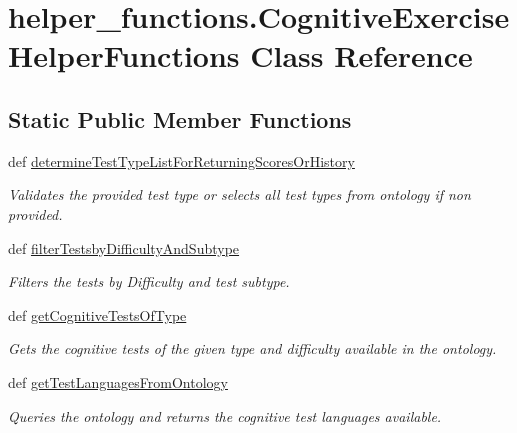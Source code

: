 \hypertarget{classhelper__functions_1_1CognitiveExerciseHelperFunctions}{\section{helper\-\_\-functions.\-Cognitive\-Exercise\-Helper\-Functions Class Reference}
\label{classhelper__functions_1_1CognitiveExerciseHelperFunctions}
}
\subsection*{Static Public Member Functions}
\begin{DoxyCompactItemize}
\item 
def \hyperlink{classhelper__functions_1_1CognitiveExerciseHelperFunctions_a3c7b93ecb18a8f644acd41b39c7cda38}{determine\-Test\-Type\-List\-For\-Returning\-Scores\-Or\-History}
\begin{DoxyCompactList}\small\item\em Validates the provided test type or selects all test types from ontology if non provided. \end{DoxyCompactList}\item 
def \hyperlink{classhelper__functions_1_1CognitiveExerciseHelperFunctions_a5f06797d72eabbb7f2fe16cd78a53a2f}{filter\-Testsby\-Difficulty\-And\-Subtype}
\begin{DoxyCompactList}\small\item\em Filters the tests by Difficulty and test subtype. \end{DoxyCompactList}\item 
def \hyperlink{classhelper__functions_1_1CognitiveExerciseHelperFunctions_ab6068ecebe273ff39840754b613d2474}{get\-Cognitive\-Tests\-Of\-Type}
\begin{DoxyCompactList}\small\item\em Gets the cognitive tests of the given type and difficulty available in the ontology. \end{DoxyCompactList}\item 
def \hyperlink{classhelper__functions_1_1CognitiveExerciseHelperFunctions_a9de637525f6de5c9e48c3ad7cd76843f}{get\-Test\-Languages\-From\-Ontology}
\begin{DoxyCompactList}\small\item\em Queries the ontology and returns the cognitive test languages available. \end{DoxyCompactList}\item 

\end{DoxyCompactItemize}
